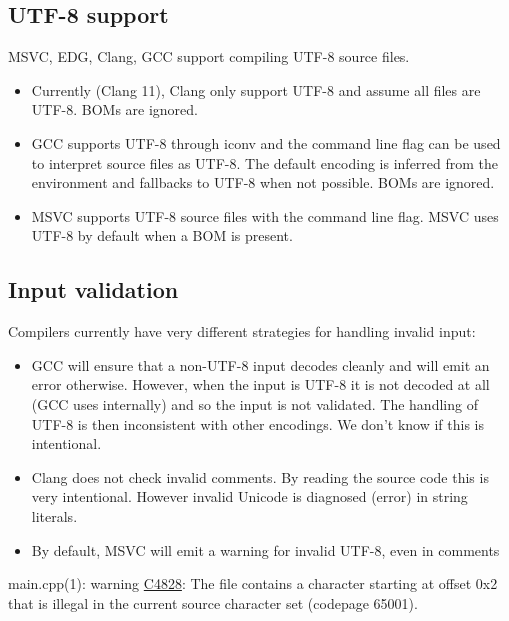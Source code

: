 \documentclass{wg21}
\begin{document}
\subsection{UTF-8 support}
MSVC, EDG, Clang, GCC support compiling UTF-8 source files.

\begin{itemize}
\item Currently (Clang 11), Clang only support UTF-8 and assume all files are UTF-8. BOMs are ignored.
\item GCC supports UTF-8 through iconv and the command line flag  can be used to interpret source files as UTF-8.
The default encoding is inferred from the environment and fallbacks to UTF-8 when not possible. BOMs are ignored.
\item MSVC supports UTF-8 source files with the  command line flag. MSVC uses UTF-8 by default when a BOM is present.
\end{itemize}


\subsection{Input validation}

Compilers currently have very different strategies for handling invalid input:

\begin{itemize}
\item GCC will ensure that a non-UTF-8 input decodes cleanly and will emit an error otherwise. However, when the input is UTF-8 it is
not decoded at all (GCC uses internally) and so the input is not validated. The handling of UTF-8 is then inconsistent with other encodings.
We don't know if this is intentional.
\item Clang does not check invalid comments. By reading the source code this is very intentional. However invalid Unicode is diagnosed (error) in string literals.
\item By default, MSVC will emit a warning for invalid UTF-8, even in comments
\end{itemize}

\begin{quoteblock}
main.cpp(1): warning \href{https://docs.microsoft.com/en-us/cpp/error-messages/compiler-warnings/compiler-warnings-by-compiler-version?view=msvc-160#warnings-introduced-in-visual-studio-2015-update-2-compiler-version-1900239180}{C4828}: The file contains a character starting at offset 0x2 that is illegal in the current source character set (codepage 65001).
\end{quoteblock}
\end{document}
